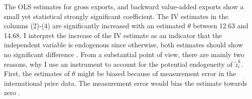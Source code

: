 \par
The OLS estimates for gross exports, and backward value-added exports show a small yet statistical strongly significant coefficient.
 The IV estimates in the columns (2)-(4) are significantly increased with an estimated $\theta$ between 12.63 and 14.68.
 I interpret the increase of the IV estimate as an indicator that the independent variable is endogenous since otherwise, both estimates should show no significant difference \textcite{hausman1978}.
From a substantial point of view, there are mainly two reasons, why I use an instrument to account for the potential endogeneity of $\tilde{z}^k_i $.
First, the estimates of $\theta$ might be biased because of measurement error in the international price data.
The measurement error would bias the estimate towards zero \parencite{AngristKrueger01}.
